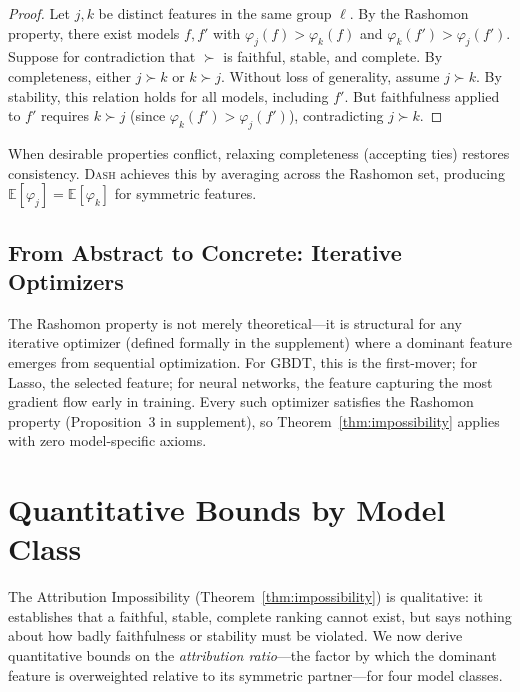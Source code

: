 \documentclass{article}
\newcommand{\E}{\mathbb{E}}
\newcommand{\DASH}{\textsc{Dash}}
\newcommand{\GBDT}{\textsc{GBDT}}
\begin{document}
\begin{proof}
Let $j, k$ be distinct features in the same group $\ell$.
By the Rashomon property, there exist models $f, f'$ with $\varphi_j(f) > \varphi_k(f)$ and $\varphi_k(f') > \varphi_j(f')$.
Suppose for contradiction that $\succ$ is faithful, stable, and complete.
By completeness, either $j \succ k$ or $k \succ j$.
Without loss of generality, assume $j \succ k$.
By stability, this relation holds for all models, including $f'$.
But faithfulness applied to $f'$ requires $k \succ j$ (since $\varphi_k(f') > \varphi_j(f')$), contradicting $j \succ k$.
\end{proof}

When desirable properties conflict, relaxing completeness (accepting ties) restores consistency.
\DASH{} achieves this by averaging across the Rashomon set, producing $\E[\varphi_j] = \E[\varphi_k]$ for symmetric features.

\subsection{From Abstract to Concrete: Iterative Optimizers}
\label{sec:iterative}

The Rashomon property is not merely theoretical---it is structural for any iterative optimizer (defined formally in the supplement) where a dominant feature emerges from sequential optimization.
For \GBDT{}, this is the first-mover; for Lasso, the selected feature; for neural networks, the feature capturing the most gradient flow early in training.
Every such optimizer satisfies the Rashomon property (Proposition~3 in supplement), so Theorem~\ref{thm:impossibility} applies with zero model-specific axioms.

\section{Quantitative Bounds by Model Class}
\label{sec:bounds}

The Attribution Impossibility (Theorem~\ref{thm:impossibility}) is qualitative: it establishes that a faithful, stable, complete ranking cannot exist, but says nothing about how badly faithfulness or stability must be violated.
We now derive quantitative bounds on the \emph{attribution ratio}---the factor by which the dominant feature is overweighted relative to its symmetric partner---for four model classes.
\end{document}
